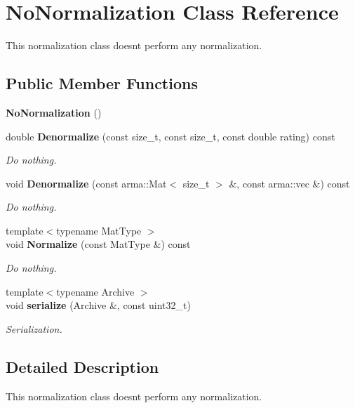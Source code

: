 \section{No\+Normalization Class Reference}
\label{classmlpack_1_1cf_1_1NoNormalization}


This normalization class doesn\textquotesingle{}t perform any normalization.  


\subsection*{Public Member Functions}
\begin{DoxyCompactItemize}
\item 
\textbf{ No\+Normalization} ()
\item 
double \textbf{ Denormalize} (const size\+\_\+t, const size\+\_\+t, const double rating) const
\begin{DoxyCompactList}\small\item\em Do nothing. \end{DoxyCompactList}\item 
void \textbf{ Denormalize} (const arma\+::\+Mat$<$ size\+\_\+t $>$ \&, const arma\+::vec \&) const
\begin{DoxyCompactList}\small\item\em Do nothing. \end{DoxyCompactList}\item 
{\footnotesize template$<$typename Mat\+Type $>$ }\\void \textbf{ Normalize} (const Mat\+Type \&) const
\begin{DoxyCompactList}\small\item\em Do nothing. \end{DoxyCompactList}\item 
{\footnotesize template$<$typename Archive $>$ }\\void \textbf{ serialize} (Archive \&, const uint32\+\_\+t)
\begin{DoxyCompactList}\small\item\em Serialization. \end{DoxyCompactList}\end{DoxyCompactItemize}


\subsection{Detailed Description}
This normalization class doesn\textquotesingle{}t perform any normalization. 

